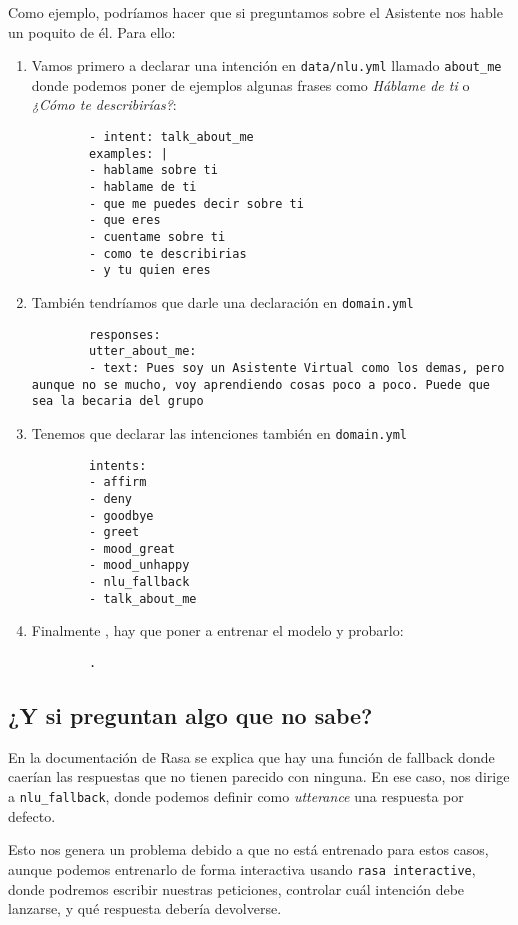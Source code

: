Como ejemplo, podríamos hacer que si preguntamos sobre el Asistente nos hable un poquito de él. Para ello:

\begin{enumerate}
	\item Vamos primero a declarar una intención en \texttt{data/nlu.yml} llamado \texttt{about\_me} donde podemos poner de ejemplos algunas frases como \textit{Háblame de ti} o \textit{¿Cómo te describirías?}:
	\begin{lstlisting}
		- intent: talk_about_me
		examples: |
		- hablame sobre ti
		- hablame de ti
		- que me puedes decir sobre ti
		- que eres
		- cuentame sobre ti
		- como te describirias
		- y tu quien eres
	\end{lstlisting}

	\item También tendríamos que darle una declaración en \texttt{domain.yml}
	\begin{lstlisting}
		responses:
		utter_about_me:
		- text: Pues soy un Asistente Virtual como los demas, pero aunque no se mucho, voy aprendiendo cosas poco a poco. Puede que sea la becaria del grupo
	\end{lstlisting}

	\item Tenemos que declarar las intenciones también en \texttt{domain.yml}
	\begin{lstlisting}
		intents:
		- affirm
		- deny
		- goodbye
		- greet
		- mood_great
		- mood_unhappy
		- nlu_fallback
		- talk_about_me
	\end{lstlisting}

	\item Finalmente , hay que poner a entrenar el modelo y probarlo:
	\begin{lstlisting}
		.
	\end{lstlisting}
\end{enumerate}

\subsection{¿Y si preguntan algo que no sabe?}

En la documentación de Rasa se explica que hay una función de fallback \cite{rasa-fallback} donde caerían las respuestas que no tienen parecido con ninguna. En ese caso, nos dirige a \texttt{nlu\_fallback}, donde podemos definir como \textit{utterance} una respuesta por defecto.

Esto nos genera un problema debido a que no está entrenado para estos casos, aunque podemos entrenarlo de forma interactiva usando \texttt{rasa interactive}, donde podremos escribir nuestras peticiones, controlar cuál intención debe lanzarse, y qué respuesta debería devolverse. 

